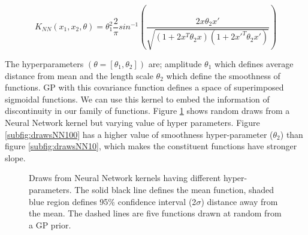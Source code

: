 \begin{equation}\label{eqnNNKernel}
K_{NN}(x_{1}, x_{2}, \theta) = \theta_{1}^{2}\frac{2}{\pi} sin^{-1}\left ( \frac{2x\theta_{2}x'}{\sqrt{(1+2x^{T}\theta_{2}x)(1+2x'^{T}\theta_{2}x')}} \right )
\end{equation}

The hyperparameters $(\theta = [\theta_{1}, \theta_{2}])$ are; amplitude $\theta_{1}$ which defines average distance from mean and the length scale $\theta_{2}$ which define the smoothness of functions. GP with this covariance function defines a space of superimposed sigmoidal functions. We can use this kernel to embed the information of discontinuity in our family of functions. Figure \ref{figNNPrior} shows random draws from a Neural Network kernel but varying value of hyper parameters. Figure \ref{subfig:drawsNN100} has a higher value of smoothness hyper-parameter ($\theta_{2}$) than figure \ref{subfig:drawsNN10}, which makes the constituent functions have stronger slope.

\begin{figure}[!ht]
  \centering
  \quad
    \quad
  \caption{Draws from Neural Network kernels having different hyper-parameters. The solid black line defines the mean function, shaded blue region defines 95\% confidence interval (2$\sigma$) distance away from the mean. The dashed lines are five functions drawn at random from a GP prior.}
  \label{figNNPrior}
\end{figure}


